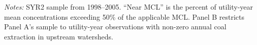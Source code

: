 \begin{table}[htbp]
{\begin{tabular}
\bottomrule
\end{tabular}
}
\begin{minipage}{16.4682cm}
\vspace{4pt}
\footnotesize
\raggedright
\textit{Notes:} SYR2 sample from 1998--2005. ``Near MCL'' is the percent of utility-year mean concentrations exceeding 50\% of the applicable MCL. Panel B restricts Panel A's sample to utility-year observations with non-zero annual coal extraction in upstream watersheds.
\end{minipage}
\end{table}
